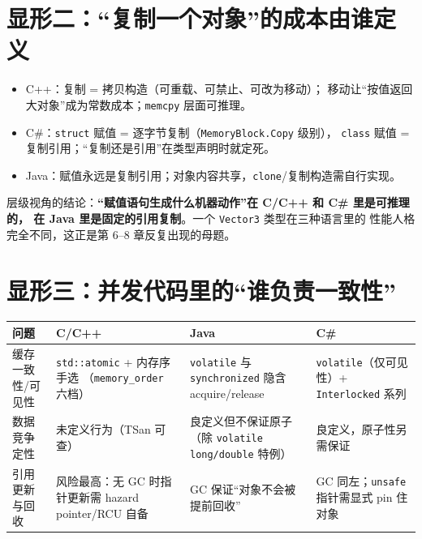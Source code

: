 \documentclass[12pt,a4paper,fontset=fandol]{ctexbook}
\newcommand{\Cplus}[1]{C++\,#1}
\begin{document}
\section{显形二：``复制一个对象''的成本由谁定义}

\begin{itemize}
  \item C++：复制 = 拷贝构造（可重载、可禁止、可改为移动）；
        移动让``按值返回大对象''成为常数成本；\texttt{memcpy} 层面可推理。
  \item C\#：\texttt{struct} 赋值 = 逐字节复制（\texttt{MemoryBlock.Copy} 级别），
        \texttt{class} 赋值 = 复制引用；``复制还是引用''在类型声明时就定死。
  \item Java：赋值永远是复制引用；对象内容共享，\texttt{clone}/复制构造需自行实现。
\end{itemize}

层级视角的结论：\textbf{``赋值语句生成什么机器动作''在 C/C++ 和 C\# 里是可推理的，
在 Java 里是固定的引用复制}。一个 \texttt{Vector3} 类型在三种语言里的
性能人格完全不同，这正是第 6--8 章反复出现的母题。

\section{显形三：并发代码里的``谁负责一致性''}

\begin{longtable}{@{}>{\raggedright\arraybackslash}p{}>{\raggedright\arraybackslash}p{}>{\raggedright\arraybackslash}p{}>{\raggedright\arraybackslash}p{}@{}}
\toprule
\textbf{问题} & \textbf{C/\allowbreak{}\Cplus{}} & \textbf{Java} & \textbf{C\#} \\
\midrule
缓存一致性/可见性 & \texttt{std::atomic} + 内存序手选
  （\texttt{memory\_order} 六档） &
  \texttt{volatile} 与 \texttt{synchronized} 隐含 acquire/\allowbreak{}\allowbreak{}release &
  \texttt{volatile}（仅可见性）+ \texttt{Interlocked} 系列 \\
\addlinespace
数据竞争定性 & 未定义行为（TSan 可查） &
  良定义但不保证原子（除 \texttt{volatile long/\allowbreak{}\allowbreak{}double} 特例） &
  良定义，原子性另需保证 \\
\addlinespace
引用更新与回收 & 风险最高：无 GC 时指针更新需
  hazard pointer/RCU 自备 & GC 保证``对象不会被提前回收'' &
  GC 同左；\texttt{unsafe} 指针需显式 pin 住对象 \\
\bottomrule
\end{longtable}
\end{document}
